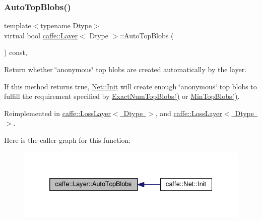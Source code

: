 \mbox{\label{classcaffe_1_1_layer_a50130669e230a168d1f8fbbb8171f054}} 
\subsubsection{\texorpdfstring{Auto\+Top\+Blobs()}{AutoTopBlobs()}\hspace{0.1cm}{\footnotesize\ttfamily [1/2]}}
{\footnotesize\ttfamily template$<$typename Dtype$>$ \\
virtual bool \mbox{\hyperlink{classcaffe_1_1_layer}{caffe\+::\+Layer}}$<$ Dtype $>$\+::Auto\+Top\+Blobs (\begin{DoxyParamCaption}{ }\end{DoxyParamCaption}) const\hspace{0.3cm}{\ttfamily [inline]}, {\ttfamily [virtual]}}



Return whether \char`\"{}anonymous\char`\"{} top blobs are created automatically by the layer. 

If this method returns true, \mbox{\hyperlink{classcaffe_1_1_net_ae9fcfaabc89165d6c0cb4b14b4c6b584}{Net\+::\+Init}} will create enough \char`\"{}anonymous\char`\"{} top blobs to fulfill the requirement specified by \mbox{\hyperlink{classcaffe_1_1_layer_a64e2ca72c719e4b2f1f9216ccfb0d37f}{Exact\+Num\+Top\+Blobs()}} or \mbox{\hyperlink{classcaffe_1_1_layer_ab9e4c8d642e413948b131d851a8462a4}{Min\+Top\+Blobs()}}. 

Reimplemented in \mbox{\hyperlink{classcaffe_1_1_loss_layer_ae98a9942cdb1c67e09d45cc2d876618e}{caffe\+::\+Loss\+Layer$<$ Dtype $>$}}, and \mbox{\hyperlink{classcaffe_1_1_loss_layer_ae98a9942cdb1c67e09d45cc2d876618e}{caffe\+::\+Loss\+Layer$<$ Dtype $>$}}.

Here is the caller graph for this function\+:
\nopagebreak
\begin{figure}[H]
\begin{center}
\leavevmode
\includegraphics[width=332pt]{classcaffe_1_1_layer_a50130669e230a168d1f8fbbb8171f054_icgraph}
\end{center}
\end{figure}
\mbox{\label{classcaffe_1_1_layer_a50130669e230a168d1f8fbbb8171f054}} 

